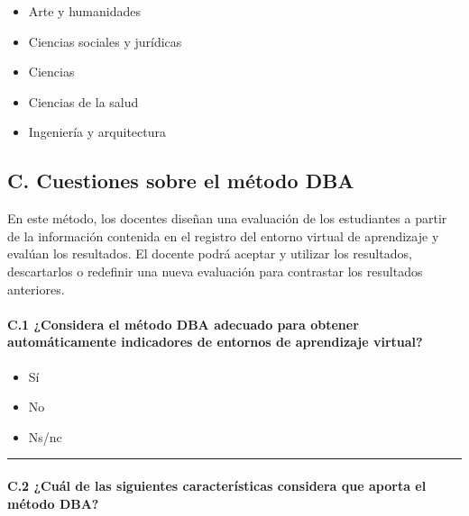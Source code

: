 \begin{mdframed}[style=cuestionarioST]
			\begin{itemize}
				\item Arte y humanidades
				\item Ciencias sociales y jurídicas
				\item Ciencias
				\item Ciencias de la salud
				\item Ingeniería y arquitectura
			\end{itemize}
\end{mdframed}

	
\newpage

	\subsection*{C. Cuestiones sobre el método DBA}

\begin{mdframed}[style=cuestionarioST]
	En este método, los docentes diseñan una evaluación de los estudiantes a partir de la información contenida en el registro del entorno virtual de aprendizaje y evalúan los resultados. El docente podrá aceptar y utilizar los resultados, descartarlos o redefinir una nueva evaluación para contrastar los resultados anteriores.
\end{mdframed}


	\paragraph*{C.1 ¿Considera el método DBA adecuado para obtener automáticamente indicadores de entornos de aprendizaje virtual?}

\begin{mdframed}[style=cuestionarioST]
			\begin{itemize}
				\item Sí
				\item No
				\item Ns/nc
			\end{itemize}

			\rule{30mm}{1pt} \newline
\end{mdframed}


	\paragraph*{C.2 ¿Cuál de las siguientes características considera que aporta el método DBA?}

